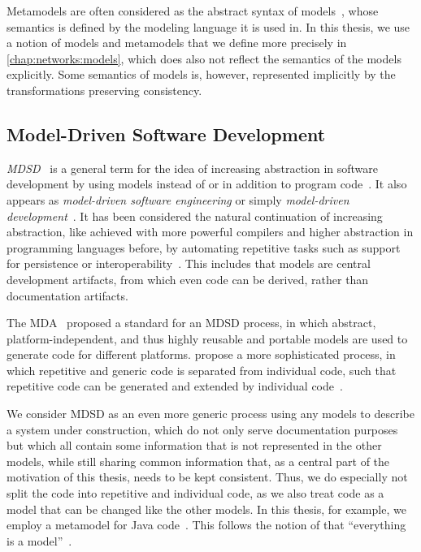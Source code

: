 Metamodels are often considered as the abstract syntax of models~\cite[p.~27]{voelter2013DslEngineering}, whose semantics is defined by the modeling language it is used in.
In this thesis, we use a notion of models and metamodels that we define more precisely in \autoref{chap:networks:models}, which does also not reflect the semantics of the models explicitly.
Some semantics of models is, however, represented implicitly by the transformations preserving consistency.


\subsection{Model-Driven Software Development}
\label{chap:foundations:modeling:mdsd}

\emph{\gls{MDSD}}~\cite{stahl2006mdsd-Book} is a general term for the idea of increasing abstraction in software development by using models instead of or in addition to program code~\cite{atkinson2003mdd-Software}.
It also appears as \emph{model-driven software engineering} or simply \emph{model-driven development}~\cite{atkinson2003mdd-Software}.
It has been considered the natural continuation of increasing abstraction, like achieved with more powerful compilers and higher abstraction in programming languages before, by automating repetitive tasks such as support for persistence or interoperability~\cite{atkinson2003mdd-Software}.
This includes that models are central development artifacts, from which even code can be derived, rather than documentation artifacts.

The \gls{MDA}~\cite{mda} proposed a standard for an \gls{MDSD} process, in which abstract, platform-independent, and thus highly reusable and portable models are used to generate code for different platforms.
\citeauthor{stahl2006mdsd-Book} propose a more sophisticated process, in which repetitive and generic code is separated from individual code, such that repetitive code can be generated and extended by individual code~\cite[Fig.~2.1]{stahl2006mdsd-Book}.

We consider \gls{MDSD} as an even more generic process using any models to describe a system under construction, which do not only serve documentation purposes but which all contain some information that is not represented in the other models, while still sharing common information that, as a central part of the motivation of this thesis, needs to be kept consistent.
Thus, we do especially not split the code into repetitive and individual code, as we also treat code as a model that can be changed like the other models.
In this thesis, for example, we employ a metamodel for Java code~\cite{heidenreich2010jamopp-SLE}.
This follows the notion of \citeauthor{bezivin2005sosym} that \enquote{everything is a model}~\cite{bezivin2005sosym}.



